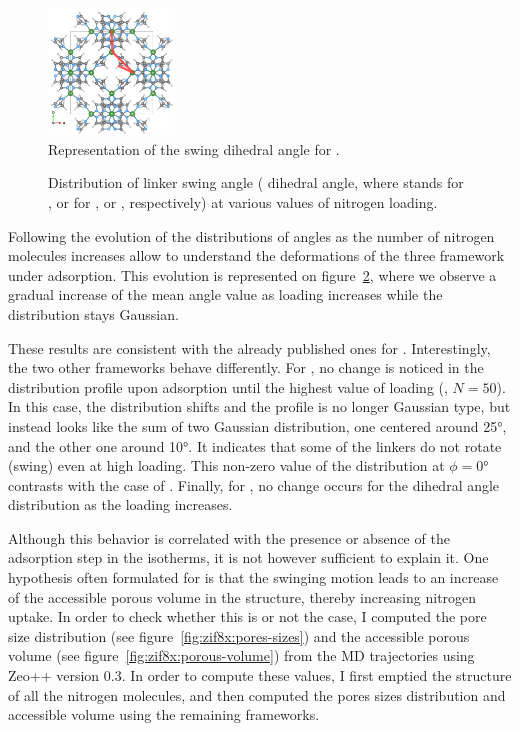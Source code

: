 \documentclass[thesis]{subfiles}
\begin{document}
\begin{figure}[ht]
    \centering
    \includegraphics[width=0.3\textwidth]{figures/images/swing-angle}
    \caption{Representation of the swing  dihedral angle for .}
    \label{fig:zif8x:swing-angle}
\end{figure}

\begin{figure}[ht]
    \centering
    
    \caption{Distribution of linker swing angle ( dihedral angle,
    where  stands for ,  or  for , \ZIFCl or
    \ZIFBr, respectively) at various values of nitrogen loading.}
    \label{fig:zif8x:dihedrals}
\end{figure}

Following the evolution of the distributions of angles as the number of nitrogen
molecules increases allow to understand the deformations of the three framework
under adsorption. This evolution is represented on
figure~\ref{fig:zif8x:dihedrals}, where we observe a gradual increase of the
mean angle value as loading increases while the distribution stays Gaussian.

These results are consistent with the already published ones for
\cite{Coudert2017}. Interestingly, the two other frameworks behave
differently. For \ZIFCl, no change is noticed in the distribution profile upon
adsorption until the highest value of loading (\ie, $N = 50$). In this case, the
distribution shifts and the profile is no longer Gaussian type, but instead
looks like the sum of two Gaussian distribution, one centered around 25°, and
the other one around 10°. It indicates that some of the linkers do not rotate
(swing) even at high loading. This non-zero value of the distribution at $\phi =
0\text{°}$ contrasts with the case of . Finally, for \ZIFBr, no change
occurs for the dihedral angle distribution as the loading increases.

Although this behavior is correlated with the presence or absence of the
adsorption step in the isotherms, it is not however sufficient to explain it.
One hypothesis often formulated for  is that the swinging motion leads to
an increase of the accessible porous volume in the structure, thereby increasing
nitrogen uptake. In order to check whether this is or not the case, I computed
the pore size distribution (see figure~\ref{fig:zif8x:pores-sizes}) and the
accessible porous volume (see figure~\ref{fig:zif8x:porous-volume}) from the MD
trajectories using Zeo++\cite{Willems2012} version 0.3. In order to compute
these values, I first emptied the structure of all the nitrogen molecules, and
then computed the pores sizes distribution and accessible volume using the
remaining frameworks.
\end{document}
